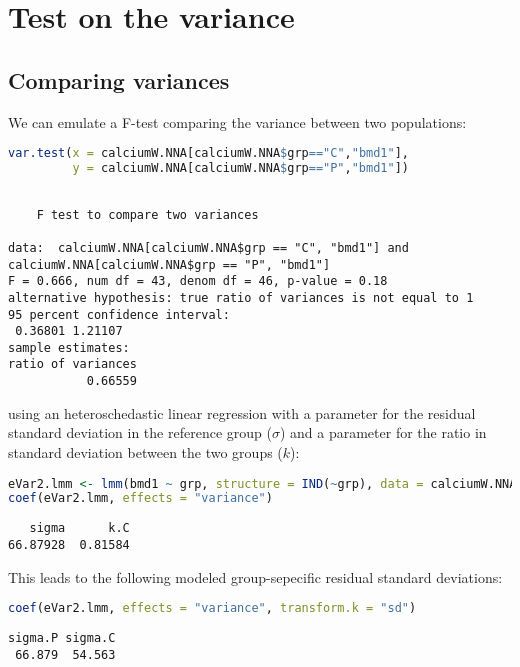 \documentclass[12pt]{article}
\begin{document}
\clearpage
\section{Test on the variance}
\label{sec:orga1a8f51}

\subsection{Comparing variances}
\label{sec:org74b7093}

We can emulate a F-test comparing the variance between two populations:
\begin{lstlisting}[language=r,numbers=none]
var.test(x = calciumW.NNA[calciumW.NNA$grp=="C","bmd1"],
         y = calciumW.NNA[calciumW.NNA$grp=="P","bmd1"])
\end{lstlisting}

\label{}
\begin{verbatim}

	F test to compare two variances

data:  calciumW.NNA[calciumW.NNA$grp == "C", "bmd1"] and calciumW.NNA[calciumW.NNA$grp == "P", "bmd1"]
F = 0.666, num df = 43, denom df = 46, p-value = 0.18
alternative hypothesis: true ratio of variances is not equal to 1
95 percent confidence interval:
 0.36801 1.21107
sample estimates:
ratio of variances 
           0.66559
\end{verbatim}

using an heteroschedastic linear regression with a parameter for the
residual standard deviation in the reference group (\(\sigma\)) and a
parameter for the ratio in standard deviation between the two groups
(\(k\)):
\begin{lstlisting}[language=r,numbers=none]
eVar2.lmm <- lmm(bmd1 ~ grp, structure = IND(~grp), data = calciumW.NNA)
coef(eVar2.lmm, effects = "variance")     
\end{lstlisting}

\label{}
\begin{verbatim}
   sigma      k.C 
66.87928  0.81584
\end{verbatim}


This leads to the following modeled group-sepecific residual standard
deviations:
\begin{lstlisting}[language=r,numbers=none]
coef(eVar2.lmm, effects = "variance", transform.k = "sd")
\end{lstlisting}

\label{}
\begin{verbatim}
sigma.P sigma.C 
 66.879  54.563
\end{verbatim}
\end{document}
